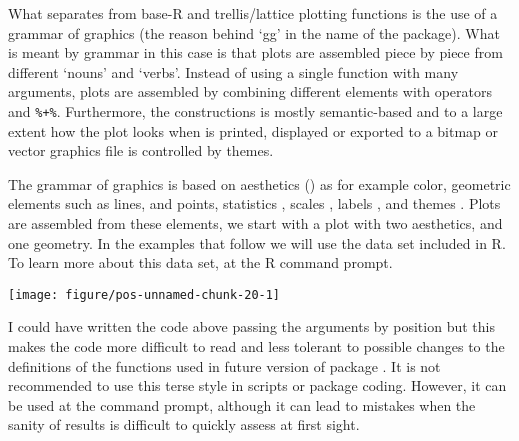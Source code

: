 \documentclass[paper=a4,headsepline,BCOR=12mm,twoside,open=right,%
titlepage,headings=small,fontsize=10pt,index=totoc,bibliography=totoc,%
captions=tableheading,captions=nooneline]{scrbook}\usepackage{knitr}
\begin{document}
What separates \ggplot from base-R and trellis/lattice plotting functions is the use of a grammar of graphics (the reason behind `gg' in the name of the package). What is meant by grammar in this case is that plots are assembled piece by piece from different `nouns' and `verbs'. Instead of using a single function with many arguments, plots are assembled by combining different elements with operators \code{+} and \verb|%+%|. Furthermore, the constructions is mostly semantic-based and to a large extent how the plot looks when is printed, displayed or exported to a bitmap or vector graphics file is controlled by themes.

The grammar of graphics is based on aesthetics () as for example color, geometric elements  such as lines, and points, statistics , scales , labels , and themes . Plots are assembled from these elements, we start with a plot with two aesthetics, and one geometry. In the examples that follow we will use the  data set included in R. To learn more about this data set,  at the R command prompt.

\begin{knitrout}\footnotesize
{}\color{fgcolor}\begin{kframe}
\begin{alltt}
\hlstd{(}  \hlstd{(}    \hlopt{+}
  \hlstd{()}
\end{alltt}
\end{kframe}

{\centering \texttt{[image: figure/pos-unnamed-chunk-20-1]} 

}



\end{knitrout}

I could have written the code above passing the arguments by position but this
makes the code more difficult to read and less tolerant to possible changes to the
definitions of the functions used in future version of package \ggplot. It is not
recommended to use this terse style in scripts or package coding. However, it can
be used at the command prompt, although it can lead to mistakes when the sanity
of results is difficult to quickly assess at first sight.
\end{document}
